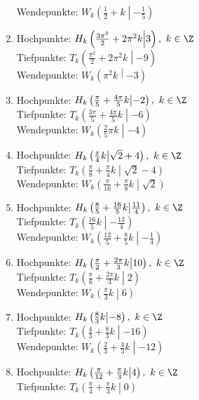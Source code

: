 \begin{Answer}[ref=sincosExtremWendeA1]
\begin{enumerate}[label=\alph*)]
		Wendepunkte: \(W_k\left(\frac{1}{2}+k \middle\vert-\frac{1}{5} \right)\)
		\item Hochpunkte: \(H_k\left(\frac{3\pi^2}{2}+2\pi^2 k \middle\vert3 \right),\ k\in\Z\)\\
		Tiefpunkte: \(T_k\left(\frac{\pi^2}{2}+2\pi^2 k \middle\vert-9 \right)\)\\
		Wendepunkte: \(W_k\left(\pi^2 k \middle\vert-3 \right)\)
		\item Hochpunkte: \(H_k\left(\frac{\pi}{5}+\frac{4\pi}{5}k \middle\vert-2 \right),\ k\in\Z\)\\
		Tiefpunkte: \(T_k\left(\frac{3\pi}{5}+\frac{4\pi}{5}k \middle\vert-6 \right)\)\\
		Wendepunkte: \(W_k\left(\frac{2}{5}\pi k \middle\vert-4 \right)\)
		\item Hochpunkte: \(H_k\left(\frac{\pi}{4}k \middle\vert\sqrt{2}+4 \right),\ k\in\Z\)\\
		Tiefpunkte: \(T_k\left(\frac{\pi}{8}+\frac{\pi}{4}k \middle\vert\sqrt{2}-4 \right)\)\\
		Wendepunkte: \(W_k\left(\frac{\pi}{16}+\frac{\pi}{8}k \middle\vert\sqrt{2} \right)\)
		\item Hochpunkte: \(H_k\left(\frac{8}{5}+\frac{16}{5}k \middle\vert\frac{11}{4} \right),\ k\in\Z\)\\
		Tiefpunkte: \(T_k\left(\frac{16}{5}k \middle\vert-\frac{13}{4} \right)\)\\
		Wendepunkte: \(W_k\left(\frac{12}{5}+\frac{8}{5}k \middle\vert -\frac{1}{4}\right)\)
		\item Hochpunkte: \(H_k\left(\frac{\pi}{2}+\frac{2\pi}{3}k \middle\vert10 \right),\ k\in\Z\)\\
		Tiefpunkte: \(T_k\left(\frac{\pi}{6}+\frac{2\pi}{3}k \middle\vert2 \right)\)\\
		Wendepunkte: \(W_k\left(\frac{\pi}{3}k \middle\vert6 \right)\)
		\item Hochpunkte: \(H_k\left(\frac{8}{3}k \middle\vert-8 \right),\ k\in\Z\)\\
		Tiefpunkte: \(T_k\left(\frac{4}{3}+\frac{8}{3}k \middle\vert-16 \right)\)\\
		Wendepunkte: \(W_k\left(\frac{2}{3}+\frac{4}{3}k \middle\vert-12 \right)\)
		\item Hochpunkte: \(H_k\left(\frac{\pi}{12}+\frac{\pi}{3}k \middle\vert4 \right),\ k\in\Z\)\\
		Tiefpunkte: \(T_k\left(\frac{\pi}{4}+\frac{\pi}{3}k \middle\vert0 \right)\)\\

\end{enumerate}
\end{Answer}
